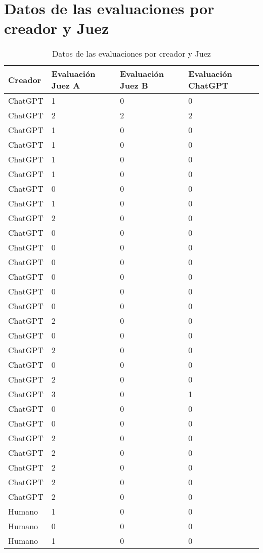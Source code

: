 \section{Datos de las evaluaciones por creador y Juez}\label{appdx2}
\setlength\LTleft{-0.125cm}
\setlength\LTright{-0.125cm}
\begin{footnotesize}
\begin{longtable}{llll}
\caption{Datos de las evaluaciones por creador y Juez}
\label{tab-13}
\\
\toprule
Creador & Evaluación Juez A & Evaluación Juez B & Evaluación ChatGPT \\
\midrule
	ChatGPT & 1 & 0 & 0 \\
	ChatGPT & 2 & 2 & 2 \\
	ChatGPT & 1 & 0 & 0 \\
	ChatGPT & 1 & 0 & 0 \\
	ChatGPT & 1 & 0 & 0 \\
	ChatGPT & 1 & 0 & 0 \\
	ChatGPT & 0 & 0 & 0 \\
	ChatGPT & 1 & 0 & 0 \\
	ChatGPT & 2 & 0 & 0 \\
	ChatGPT & 0 & 0 & 0 \\
	ChatGPT & 0 & 0 & 0 \\
	ChatGPT & 0 & 0 & 0 \\
	ChatGPT & 0 & 0 & 0 \\
	ChatGPT & 0 & 0 & 0 \\
	ChatGPT & 0 & 0 & 0 \\
	ChatGPT & 2 & 0 & 0 \\
	ChatGPT & 0 & 0 & 0 \\
	ChatGPT & 2 & 0 & 0 \\
	ChatGPT & 0 & 0 & 0 \\
	ChatGPT & 2 & 0 & 0 \\
	ChatGPT & 3 & 0 & 1 \\
	ChatGPT & 0 & 0 & 0 \\
	ChatGPT & 0 & 0 & 0 \\
	ChatGPT & 2 & 0 & 0 \\
	ChatGPT & 2 & 0 & 0 \\
	ChatGPT & 2 & 0 & 0 \\
	ChatGPT & 2 & 0 & 0 \\
	ChatGPT & 2 & 0 & 0 \\
	Humano & 1 & 0 & 0 \\
	Humano & 0 & 0 & 0 \\
	Humano & 1 & 0 & 0 \\

\end{longtable}
\end{footnotesize}
